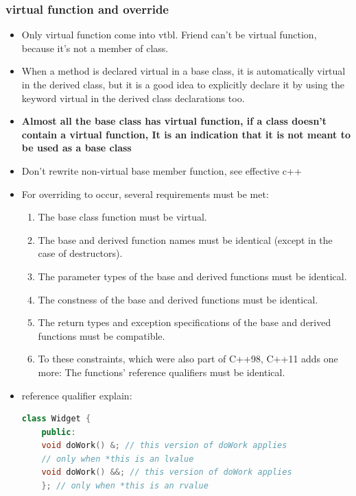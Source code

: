 \documentclass[a4paper,12pt,twoside]{book}
\begin{document}
\subsubsection{virtual function and override}
\begin{itemize}
	
	\item Only virtual function come into vtbl. Friend can't be virtual function, because it's not a member of class.
	
	\item When a method is declared virtual in a base class, it is automatically virtual in the derived class, but it is a good idea to explicitly declare it by using the keyword virtual in the derived class declarations too.
	
	\item \textbf{Almost all the base class has virtual function, if a class doesn't contain a virtual function, It is an indication that it is not meant to be used as a base class}
	
	\item Don't rewrite non-virtual base member function, see effective c++
	
	\item For overriding to occur, several requirements must be met:
	\begin{enumerate}
		\item The base class function must be virtual.
		\item The base and derived function names must be identical (except in the case of
		destructors).
		\item The parameter types of the base and derived functions must be identical.
		\item The constness of the base and derived functions must be identical.
		\item The return types and exception specifications of the base and derived functions
		must be compatible.
		\item To these constraints, which were also part of C++98, C++11 adds one more: The functions' reference qualifiers must be identical.
	\end{enumerate}
	\item reference qualifier explain:
	\begin{lstlisting}[frame=single, language=c++]
	class Widget {
	public:
	void doWork() &; // this version of doWork applies
	// only when *this is an lvalue
	void doWork() &&; // this version of doWork applies
	}; // only when *this is an rvalue
	

\end{lstlisting}
\end{itemize}
\end{document}
